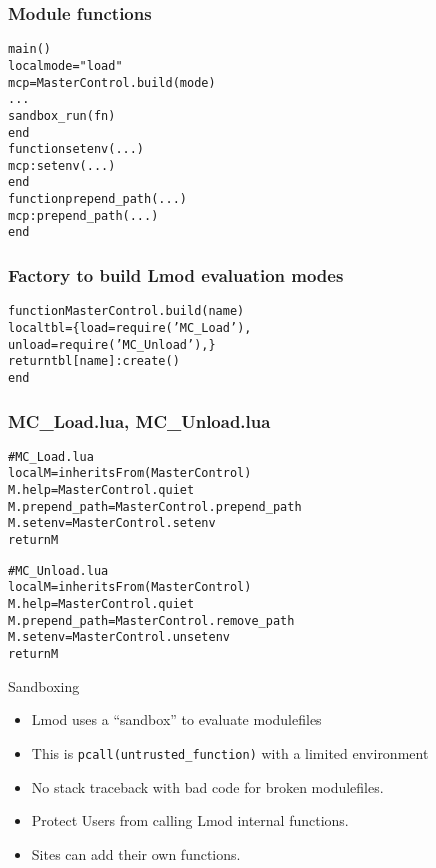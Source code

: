 \documentclass{beamer}
\begin{document}
\begin{frame}[fragile]
    \frametitle{Module functions}
    {\small
      \begin{alltt}
          main()
            local mode = "load"
            mcp = MasterControl.build(mode)
            ...
            sandbox_run(fn)
          end
          function setenv(...)
             mcp:setenv(...)
          end       
          function prepend_path(...)
             mcp:prepend_path(...)
          end       
      \end{alltt}
    }
\end{frame}    

\begin{frame}[fragile]
    \frametitle{Factory to build Lmod evaluation modes}
    {\small
      \begin{alltt}
          function MasterControl.build(name)
            local tbl = \{ load = require('MC_Load'),
                          unload = require('MC_Unload'), \}
            return tbl[name]:create()
          end

      \end{alltt}
    }
\end{frame}

\begin{frame}[fragile]
    \frametitle{MC\_Load.lua, MC\_Unload.lua}
    {\small
      \begin{alltt}
# MC_Load.lua
local M        = inheritsFrom(MasterControl)
M.help         = MasterControl.quiet
M.prepend_path = MasterControl.prepend_path
M.setenv       = MasterControl.setenv
return M

# MC_Unload.lua
local M        = inheritsFrom(MasterControl)
M.help         = MasterControl.quiet
M.prepend_path = MasterControl.remove_path
M.setenv       = MasterControl.unsetenv
return M
      \end{alltt}
    }
\end{frame}    


\begin{frame}{Sandboxing}
  \begin{itemize}
    \item Lmod uses a ``sandbox'' to evaluate modulefiles
    \item This is \texttt{pcall(untrusted\_function)} with a limited
      environment 
    \item No stack traceback with bad code for broken modulefiles.
    \item Protect Users from calling Lmod internal functions.
    \item Sites can add their own functions.
  \end{itemize}
\end{frame}
\end{document}
